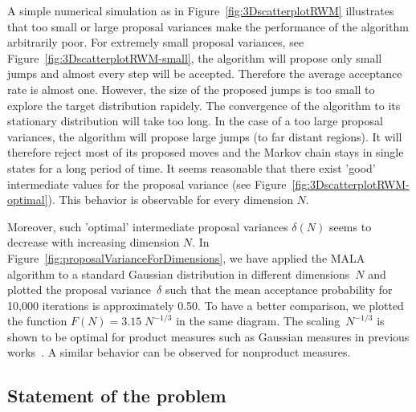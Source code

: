 A simple numerical simulation as in Figure~\ref{fig:3DscatterplotRWM} illustrates that too small or large proposal variances make the performance of the algorithm arbitrarily poor. For extremely small proposal variances, see Figure~\ref{fig:3DscatterplotRWM-small}, the algorithm will propose only small jumps and almost every step will be accepted. Therefore the average acceptance rate is almost one. However, the size of the proposed jumps is too small to explore the target distribution rapidely. The convergence of the algorithm to its stationary distribution will take too long. In the case of a too large proposal variances, the algorithm will propose large jumps (to far distant regions). It will therefore reject most of its proposed moves and the Markov chain stays in single states for a long period of time. It seems reasonable that there exist 'good' intermediate values for the proposal variance (see Figure~\ref{fig:3DscatterplotRWM-optimal}). This behavior is observable for every dimension $N$.

Moreover, such 'optimal' intermediate proposal variances $ \delta(N) $ seems to decrease with increasing dimension $N$. In Figure~\ref{fig:proposalVarianceForDimensions}, we have applied the MALA algorithm to a standard Gaussian distribution in different dimensions~$N$ and plotted the proposal variance~$\delta$ such that the mean acceptance probability for 10,000 iterations is approximately 0.50. To have a better comparison, we plotted the function $F(N) = 3.15 \; N^{-1/3}$ in the same diagram. The scaling~$N^{- 1/3}$ is shown to be optimal for product measures such as Gaussian measures in previous works~\autocite{Roberts1997, Roberts1998}. A similar behavior can be observed for nonproduct measures.

\subsection*{Statement of the problem}

